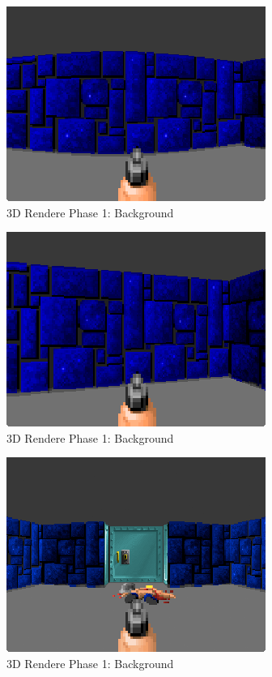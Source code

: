 \documentclass[book.tex]{subfiles}
\begin{document}
 \begin{figure}[H]
\centering
 \includegraphics[scale=1.3]{imgs/fish_eye/fish_eye.png}
 \caption{3D Rendere Phase 1: Background} \label{fig:mips}
 \end{figure}
 
  \begin{figure}[H]
\centering
 \includegraphics[scale=1.3]{imgs/fish_eye/fish_eye_corrected.png}
 \caption{3D Rendere Phase 1: Background} \label{fig:mips}
 \end{figure}
 
  \begin{figure}[H]
\centering
 \includegraphics[scale=1.3]{imgs/fish_eye/fish_eyed_start_screen2.png}
 \caption{3D Rendere Phase 1: Background} \label{fig:mips}
 \end{figure}
 
\end{document}
